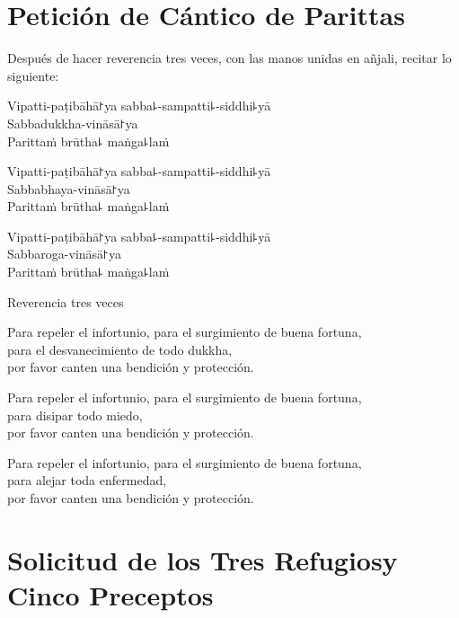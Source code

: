 \clearpage
\chapter{Petición de Cántico de Parittas}

\begin{instruction}
  Después de hacer reverencia tres veces, con las manos unidas en añjali, recitar lo siguiente:
\end{instruction}

Vipatti-paṭibāhā꜓ya sabba꜕-sampatti꜕-siddhi꜕yā\\
Sabbadukkha-vināsā꜓ya\\
Parittaṁ brūtha꜕ maṅga꜕laṁ

Vipatti-paṭibāhā꜓ya sabba꜕-sampatti꜕-siddhi꜕yā\\
Sabbabhaya-vināsā꜓ya\\
Parittaṁ brūtha꜕ maṅga꜕laṁ

Vipatti-paṭibāhā꜓ya sabba꜕-sampatti꜕-siddhi꜕yā\\
Sabbaroga-vināsā꜓ya\\
Parittaṁ brūtha꜕ maṅga꜕laṁ

\begin{instruction}
  Reverencia tres veces
\end{instruction}

\begin{english}
Para repeler el infortunio, para el surgimiento de buena fortuna,\\
para el desvanecimiento de todo dukkha,\\
por favor canten una bendición y protección.

Para repeler el infortunio, para el surgimiento de buena fortuna,\\
para disipar todo miedo,\\
por favor canten una bendición y protección.

Para repeler el infortunio, para el surgimiento de buena fortuna,\\
para alejar toda enfermedad,\\
por favor canten una bendición y protección.
\end{english}

\setlength{\englishIndent}{\leaderIndent}

\clearpage
\chapter[Tres Refugios y Cinco Preceptos]{Solicitud de los Tres Refugios\newline y Cinco Preceptos}

